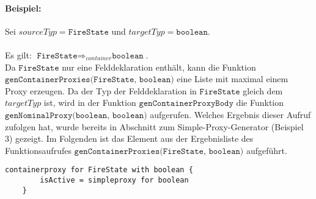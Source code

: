\documentclass[a4paper,12pt]{article}
\begin{document}
\paragraph{Beispiel: }Sei $sourceTyp = \texttt{FireState}$ und $targetTyp = \texttt{boolean}$.\\\\
Es gilt: $\texttt{FireState} \Rightarrow_{container} \texttt{boolean}$.\\
Da $\texttt{FireState}$ nur eine Felddeklaration enthält, kann die Funktion $\texttt{genContainerProxies(FireState, boolean)}$ eine Liste mit maximal einem Proxy erzeugen. Da der Typ der Felddeklaration in $\texttt{FireState}$ gleich dem $targetTyp$ ist, wird in der Funktion $\texttt{genContainerProxyBody}$ die Funktion $\texttt{genNominalProxy(boolean, boolean)}$ aufgerufen. Welches Ergebnis dieser Aufruf zufolgen hat, wurde bereits in Abschnitt zum Simple-Proxy-Generator (Beispiel 3) gezeigt. Im Folgenden ist das Element aus der Ergebnisliste des Funktionsaufrufes $\texttt{genContainerProxies(FireState, boolean)}$ aufgeführt.
\begin{lstlisting}[style = dsl]
	containerproxy for FireState with boolean {
		isActive = simpleproxy for boolean
	}
\end{lstlisting}
\end{document}
